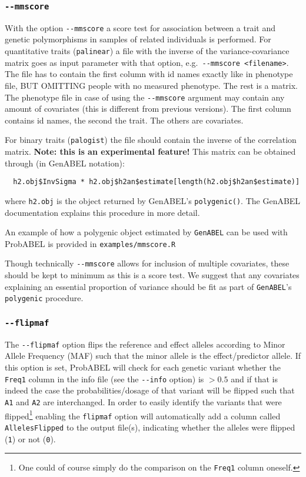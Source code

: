 \documentclass[12pt,a4paper]{article}
\newcommand{\GA}{\texttt{GenABEL}}
\begin{document}
\subsubsection{\lstinline{--mmscore}}
\label{sec:mmscore}
With the option \lstinline{--mmscore} a score test for association
between a trait and genetic polymorphisms in samples of related
individuals is performed. For quantitative traits (\texttt{palinear})
a file with the inverse of the variance-covariance matrix goes as input
parameter with that option, e.g.~\lstinline{--mmscore <filename>}. The
file has to contain the first column with id names exactly like in
phenotype file, BUT OMITTING people with no measured phenotype. The
rest is a matrix. The phenotype file in case of using the
\lstinline{--mmscore} argument may contain any amount of covariates (this
is different from previous versions). The first column contains id
names, the second the trait. The others are covariates.

For binary traits (\texttt{palogist}) the file should contain the
inverse of the correlation matrix. \textbf{Note: this is an
  experimental feature!} This matrix can be obtained through (in
GenABEL notation):
\begin{verbatim}
  h2.obj$InvSigma * h2.obj$h2an$estimate[length(h2.obj$h2an$estimate)]
\end{verbatim}
where \texttt{h2.obj} is the object returned by GenABEL's
\texttt{polygenic()}. The GenABEL documentation explains this
procedure in more detail.

An example of how a polygenic object estimated by \GA{} can be used
with ProbABEL is provided in \texttt{examples/mmscore.R}

Though technically \lstinline{--mmscore} allows for inclusion of multiple
covariates, these should be kept to minimum as this is a score test. We
suggest that any covariates explaining an essential proportion of
variance should be fit as part of \GA{}'s
\texttt{polygenic} procedure.


\subsubsection{\lstinline{--flipmaf}}
\label{sec:flipmaf}
The \lstinline{--flipmaf} option flips the reference and effect
alleles according to Minor Allele Frequency (MAF) such that the minor
allele is the effect/predictor allele. If this option is set, ProbABEL
will check for each genetic variant whether the \lstinline{Freq1}
column in the info file (see the \lstinline{--info} option) is $> 0.5$
and if that is indeed the case the probabilities/dosage of that
variant will be flipped such that \lstinline{A1} and \lstinline{A2}
are interchanged. In order to easily identify the variants that were
flipped\footnote{One could of course simply do the comparison on the
  \lstinline{Freq1} column oneself.} enabling the \lstinline{flipmaf}
option will automatically add a column called
\lstinline{AllelesFlipped} to the output file(s), indicating whether
the alleles were flipped (\lstinline{1}) or not (\lstinline{0}).
\end{document}
